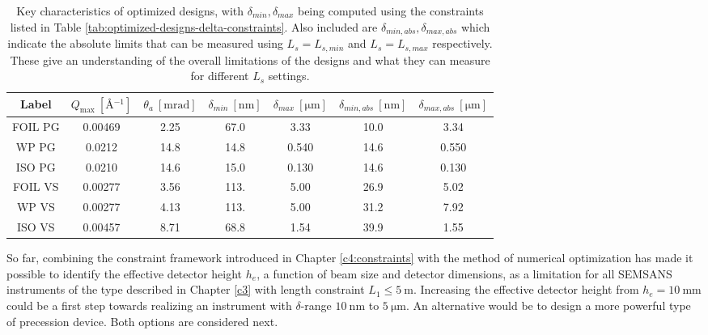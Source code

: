 \begin{table}[h!]
	\centering
	\begin{tabular}{c | c c c c | cc}
		\toprule
		Label & $Q_{\text{max}} ~[\unit{\angstrom^{-1}}]$ & $\theta_a~[\unit{\milli\radian}]$ & $\delta_{min}~[\unit{\nano\meter}]$ & $\delta_{max}~[\unit{\micro\meter}]$ & $\delta_{min,abs}~[\unit{\nano\meter}]$ & $\delta_{max,abs}~[\unit{\micro\meter}]$ \\
		\midrule
		FOIL PG & \num{0.00469} & \num{2.25} & \num{67.0} & \num{3.33} & \num{10.0} & \num{3.34} \\
		WP PG & \num{0.0212} & \num{14.8} & \num{14.8} & \num{0.540} & \num{14.6} & \num{0.550} \\
		ISO PG & \num{0.0210} & \num{14.6} & \num{15.0} & \num{0.130} & \num{14.6} & \num{0.130} \\
		FOIL VS & \num{0.00277} & \num{3.56} & \num{113.} & \num{5.00} & \num{26.9} & \num{5.02} \\
		WP VS & \num{0.00277} & \num{4.13} & \num{113.} & \num{5.00} & \num{31.2} & \num{7.92} \\
		ISO VS & \num{0.00457} & \num{8.71} & \num{68.8} & \num{1.54} & \num{39.9} & \num{1.55} \\
		\bottomrule
	\end{tabular}
	\caption{Key characteristics of optimized designs, with $\delta_{min}, \delta_{max}$ being computed using the constraints listed in Table \ref{tab:optimized-designs-delta-constraints}. Also included are $\delta_{min,abs}, \delta_{max,abs}$ which indicate the absolute limits that can be measured using $L_s = L_{s,min}$ and $L_s = L_{s,max}$ respectively. These give an understanding of the overall limitations of the designs and what they can measure for different $L_s$ settings.}
	\label{tab:optimized-designs-performance}
\end{table}

So far, combining the constraint framework introduced in Chapter \ref{c4:constraints} with the method of numerical optimization has made it possible to identify the effective detector height $h_e$, a function of beam size and detector dimensions, as a limitation for all SEMSANS instruments of the type described in Chapter \ref{c3} with length constraint $L_1 \leq \SI{5}{\meter}$. Increasing the effective detector height from $h_e = \SI{10}{\milli\meter}$ could be a first step towards realizing an instrument with $\delta$-range $\SI{10}{\nano\meter}$ to $ \SI{5}{\micro\meter}$. An alternative would be to design a more powerful type of precession device. Both options are considered next.

